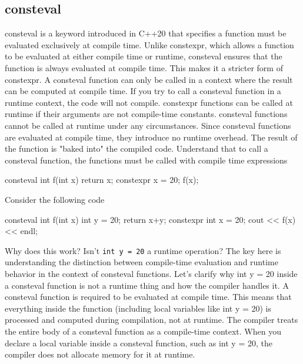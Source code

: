 \documentclass{report}
\begin{document}
\subsection{consteval}
\bigbreak \noindent 
consteval is a keyword introduced in C++20 that specifies a function must be evaluated exclusively at compile time. Unlike constexpr, which allows a function to be evaluated at either compile time or runtime, consteval ensures that the function is always evaluated at compile time. This makes it a stricter form of constexpr.
\bigbreak \noindent 
A consteval function can only be called in a context where the result can be computed at compile time.
\bigbreak \noindent 
If you try to call a consteval function in a runtime context, the code will not compile.
\bigbreak \noindent 
constexpr functions can be called at runtime if their arguments are not compile-time constants.
\bigbreak \noindent 
consteval functions cannot be called at runtime under any circumstances.
\bigbreak \noindent 
Since consteval functions are evaluated at compile time, they introduce no runtime overhead.
\bigbreak \noindent 
The result of the function is "baked into" the compiled code.
\bigbreak \noindent 
Understand that to call a consteval function, the functions must be called with compile time expressions
\bigbreak \noindent 
\begin{cppcode}
    consteval int f(int x) {
        return x;
    }
    constexpr x = 20;
    f(x);
\end{cppcode}
\bigbreak \noindent 
Consider the following code
\bigbreak \noindent 
\begin{cppcode}
    consteval int f(int x) {
        int y = 20;
        return x+y;
    }
    constexpr int x = 20;
    cout << f(x) << endl;
\end{cppcode}
\bigbreak \noindent 
Why does this work? Isn't \texttt{int y = 20} a runtime operation?  The key here is understanding the distinction between compile-time evaluation and runtime behavior in the context of consteval functions. Let’s clarify why int y = 20 inside a consteval function is not a runtime thing and how the compiler handles it.
\bigbreak \noindent 
A consteval function is required to be evaluated at compile time. This means that everything inside the function (including local variables like int y = 20) is processed and computed during compilation, not at runtime.
\bigbreak \noindent 
The compiler treats the entire body of a consteval function as a compile-time context.
\bigbreak \noindent 
When you declare a local variable inside a consteval function, such as int y = 20, the compiler does not allocate memory for it at runtime.
\end{document}
